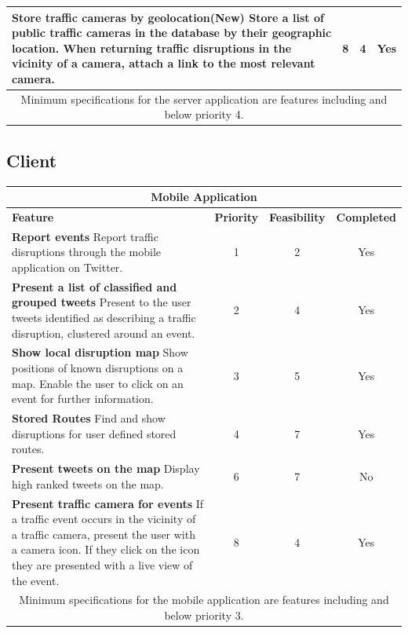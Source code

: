 \begin{center}
\begin{tabular}{ | p{8.5cm} | c | c | c | }
\textbf{Store traffic cameras by geolocation(New)}\newline
Store a list of public traffic cameras in the database by their geographic
location. When returning traffic disruptions in the vicinity of a camera,
attach a link to the most relevant camera. &  8 &  4 & Yes \\ \hline

\multicolumn{4}{|c|}{Minimum specifications for the server application are
features including and below priority 4.} \\ \hline
\end{tabular}
\end{center}

\subsection{Client}

\begin{center}
\begin{tabular}{ | p{8.5cm} | c | c | c | }
\hline
\multicolumn{4}{|c|}{\textbf{Mobile Application}} \\ \hline
\textbf{Feature} & \textbf{Priority} & \textbf{Feasibility} & \textbf{Completed} \\ \hline
\textbf{Report events}\newline
Report traffic disruptions through the mobile application on Twitter. & 1 & 2 & Yes \\ \hline

\textbf{Present a list of classified and grouped tweets}\newline
Present to the user tweets identified as describing a traffic disruption,
clustered around an event. & 2 & 4 & Yes \\ \hline

\textbf{Show local disruption map}\newline
Show positions of known disruptions on a map. Enable the user to click on an event for further information. & 3 & 5 & Yes \\ \hline

\textbf{Stored Routes}\newline
Find and show disruptions for user defined stored routes. & 4 & 7 & Yes \\ \hline \hline

\textbf{Present tweets on the map}\newline 
Display high ranked tweets on the map.& 6 & 7 & No \\ \hline 

\textbf{Present traffic camera for events}\newline
If a traffic event occurs in the vicinity of a traffic camera, present the user
with a camera icon. If they click on the icon they are presented with a live
view of the event. &  8 & 4 & Yes \\ \hline

\multicolumn{4}{|c|}{Minimum specifications for the mobile application are
features including and below priority 3.} \\ \hline
\end{tabular}
\end{center}
